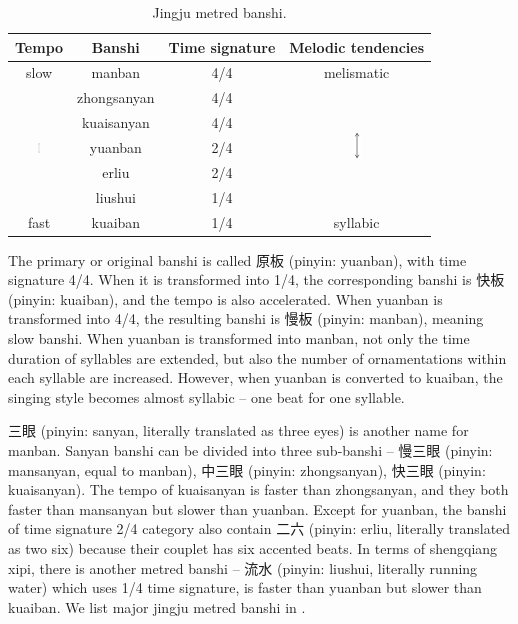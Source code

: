 \begin{table}[ht!]
\caption{Jingju metred banshi.}
\label{tab:banshi}
\centering
\begin{tabular}{cccc}
\toprule
Tempo & Banshi               & Time signature                           & Melodic tendencies  \\
\midrule
slow & manban & 4/4 & melismatic\\
\multirow{5}{*}{\includegraphics[width=0.06\textwidth]{figs/shapes/vertical_double_arrow.png}}& zhongsanyan & 4/4 & \multirow{5}{*}{\includegraphics[width=0.06\textwidth]{figs/shapes/vertical_double_arrow.png}} \\
& kuaisanyan & 4/4 & \\
& yuanban & 2/4 & \\
& erliu & 2/4 & \\
& liushui & 1/4 & \\
fast & kuaiban & 1/4 & syllabic \\
\bottomrule
\end{tabular}
\end{table}

The primary or original banshi is called 原板 (pinyin: yuanban), with time signature 4/4. When it is transformed into 1/4, the corresponding banshi is 快板 (pinyin: kuaiban), and the tempo is also accelerated. When yuanban is transformed into 4/4, the resulting banshi is 慢板 (pinyin: manban), meaning slow banshi. When yuanban is transformed into manban, not only the time duration of syllables are extended, but also the number of ornamentations within each syllable are increased. However, when yuanban is converted to kuaiban, the singing style becomes almost syllabic -- one beat for one syllable. 

三眼 (pinyin: sanyan, literally translated as three eyes) is another name for manban. Sanyan banshi can be divided into three sub-banshi -- 慢三眼 (pinyin: mansanyan, equal to manban), 中三眼 (pinyin: zhongsanyan), 快三眼 (pinyin: kuaisanyan). The tempo of kuaisanyan is faster than zhongsanyan, and they both faster than mansanyan but slower than yuanban. Except for yuanban, the banshi of time signature 2/4 category also contain 二六 (pinyin: erliu, literally translated as two six) because their couplet has six accented beats. In terms of \gls{shengqiang} xipi, there is another metred banshi -- 流水 (pinyin: liushui, literally running water) which uses 1/4 time signature, is faster than yuanban but slower than kuaiban. We list major jingju metred banshi in .

